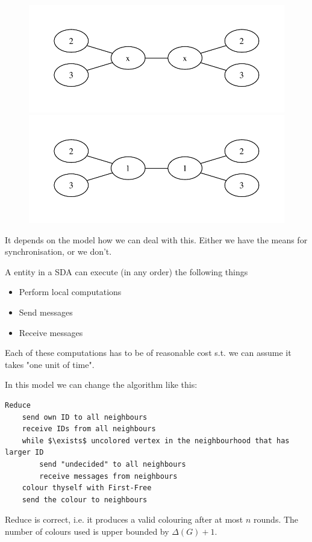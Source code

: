 \begin{figure}
\includegraphics[width=0.5\linewidth]{./images/graph1}
\includegraphics[width=0.5\linewidth]{./images/graph11}
%
\end{figure}

It depends on the model how we can deal with this. Either we have the means for synchronisation, or we don't.

\begin{Def} A entity in a SDA can execute (in any order) the following things
\begin{itemize}
\item Perform local computations
\item Send messages
\item Receive messages
\end{itemize}

Each of these computations has to be of reasonable cost s.t. we can assume it takes "one unit of time". 
\end{Def}

In this model we can change the algorithm like this:

\begin{lstlisting}
Reduce
	send own ID to all neighbours
	receive IDs from all neighbours
	while $\exists$ uncolored vertex in the neighbourhood that has larger ID
		send "undecided" to all neighbours
		receive messages from neighbours
	colour thyself with First-Free
	send the colour to neighbours
\end{lstlisting}

\begin{thm} Reduce is correct, i.e. it produces a valid colouring after at most $n$ rounds. The number of colours used is upper bounded by $\Delta(G)+1$. 
\end{thm}

\begin{pr}
\end{pr}